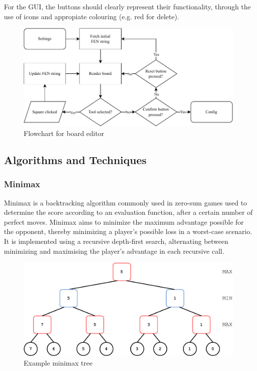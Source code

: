 \documentclass[../main/main.tex]{subfiles}
\begin{document}
For the GUI, the buttons should clearly represent their functionality, through the use of icons and appropiate colouring (e.g. red for delete).

\begin{figure}[H]
    \centering
    \includegraphics[width=\columnwidth]{../design/assets/editor_flowchart.pdf}
    \caption{Flowchart for board editor}
    \label{fig:editor-flowchart}
\end{figure}

\subsection{Algorithms and Techniques}
\subsubsection{Minimax}
Minimax is a backtracking algorithm commonly used in zero-sum games used to determine the score according to an evaluation function, after a certain number of perfect moves. Minimax aims to minimize the maximum advantage possible for the opponent, thereby minimizing a player’s possible loss in a worst-case scenario. It is implemented using a recursive depth-first search, alternating between minimizing and maximising the player’s advantage in each recursive call.

\begin{figure}[H]
    \centering
    \includegraphics[width=\columnwidth]{../design/assets/minimax.pdf}
    \caption{Example minimax tree}
    \label{fig:minimax}
\end{figure}
\end{document}
